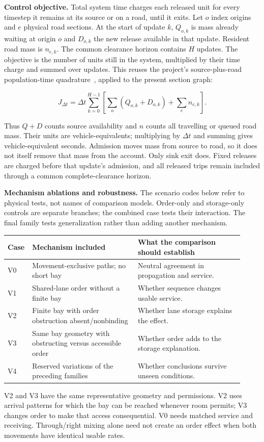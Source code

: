 \documentclass[10pt,a4paper]{article}
\begin{document}
\textbf{Control objective.} Total system time charges each released unit
for every timestep it remains at its source or on a road, until it exits.
Let $o$ index origins and $e$ physical road sections. At the start of
update $k$, $Q_{o,k}$ is mass already waiting at origin $o$ and
$D_{o,k}$ the new release available in that update. Resident road mass is
$n_{e,k}$. The common clearance horizon contains $H$ updates. The objective
is the number of units still in the system, multiplied by their time
charge and summed over updates.
This reuses the project's source-plus-road population-time quadrature~\cite{m0}, applied to the present section graph:
\par
\begin{equation}
 J_{\Delta t}
 =\Delta t\sum_{k=0}^{H-1}
 \left[\sum_o(Q_{o,k}+D_{o,k})+\sum_en_{e,k}\right].
 \label{eq:compact-tst}
\end{equation}

Thus $Q+D$ counts source availability and $n$ counts all travelling or
queued road mass. Their units are vehicle-equivalents; multiplying by
$\Delta t$ and summing gives vehicle-equivalent seconds. Admission moves
mass from source to road, so it does not itself remove that mass from
the account. Only sink exit does. Fixed releases are charged before
that update's admission, and all released trips remain included through
a common complete-clearance horizon.

\textbf{Mechanism ablations and robustness.} The scenario codes below
refer to physical tests, not names of comparison models. Order-only and
storage-only controls are separate branches; the combined case tests
their interaction. The final family tests generalization rather than
adding another mechanism.
\begin{center}
\setlength{\tabcolsep}{4pt}
\begin{tabular}{@{}>{\raggedright\arraybackslash}p{0.06\linewidth}>{\raggedright\arraybackslash}p{0.43\linewidth}>{\raggedright\arraybackslash}p{0.43\linewidth}@{}}
\toprule
Case & Mechanism included & What the comparison should establish\\
\midrule
V0 & Movement-exclusive paths; no short bay & Neutral agreement in propagation and service.\\
V1 & Shared-lane order without a finite bay & Whether sequence changes usable service.\\
V2 & Finite bay with order obstruction absent/nonbinding & Whether lane storage explains the effect.\\
V3 & Same bay geometry with obstructing versus accessible order & Whether order adds to the storage explanation.\\
V4 & Reserved variations of the preceding families & Whether conclusions survive unseen conditions.\\
\bottomrule
\end{tabular}
\end{center}
V2 and V3 have the same representative geometry and permissions.
V2 uses arrival patterns for which the bay can be reached whenever room
permits; V3 changes order to make that access consequential. V0 needs
matched service and receiving. Through/right mixing alone need not create
an order effect when both movements have identical usable rates.
\end{document}
